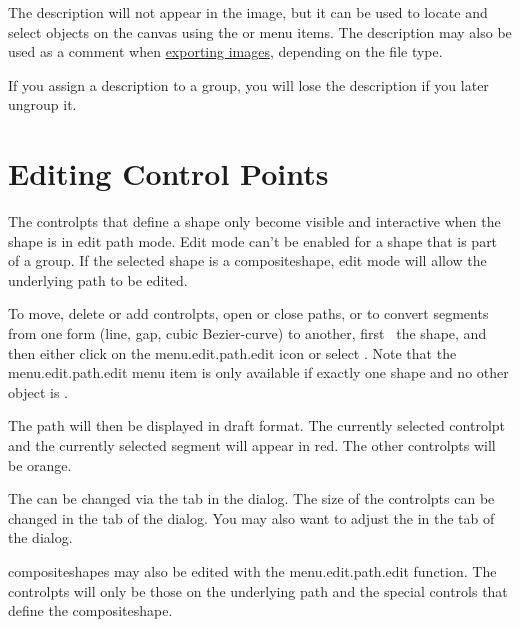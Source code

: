 The description will not appear in the image, but it can be used to
locate and select \glspl*{object} on the canvas using the
 or
 menu items. The description
may also be used as a comment when
\hyperref[sec:exportimage]{exporting images}, depending on the
file type.

\begin{important}
If you assign a description to a \gls{group},
you will lose the description if you later ungroup it.
\end{important}


\section{Editing Control Points}\label{sec:editpath}

The \glspl{controlpt} that define a \gls{shape} only become visible
and interactive when the shape is in edit path mode.
Edit mode can't be enabled for a \gls{shape} that is part of a \gls{group}.
If the selected shape is a \gls{compositeshape}, edit mode will allow the
underlying path to be edited.


To move, delete or add \glspl{controlpt}, open or close
\glspl{path}, or to convert segments from one form (line, gap, cubic
\gls{Bezier-curve}) to another, first \select\ the \gls*{shape}, and
then either click on the \gls{menu.edit.path.edit} icon or select
.  Note that the \gls{menu.edit.path.edit} menu item
is only available if exactly one \gls{shape} and no other
\gls{object} is \selected.

The \gls*{path} will then be displayed in draft format.  The
currently selected \gls*{controlpt} and the currently selected
segment will appear in red. The other \glspl*{controlpt} will be
orange.

\begin{information}
The  can be changed via the 
tab in the  dialog. The size of the
\glspl{controlpt} can be changed in the  tab
of the  dialog. You may also want to adjust the
 in the  tab of the
 dialog.
\end{information}

\Glspl{compositeshape} may also be edited with 
the \gls{menu.edit.path.edit} function. The
\glspl{controlpt} will only be those on the underlying path and 
the special controls that define the \gls{compositeshape}.

